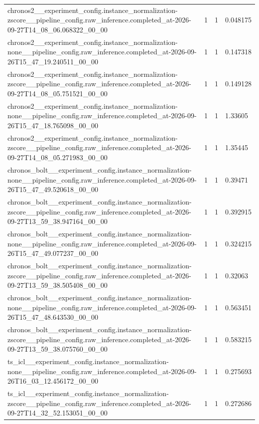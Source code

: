 \begin{tabular}{llll}
chronos2\_\_experiment\_config.instance\_normalization-zscore\_\_pipeline\_config.raw\_inference.completed\_at-2026-09-27T14\_08\_06.068322\_00\_00 & 1 & 1 & 0.048175 \\
chronos2\_\_experiment\_config.instance\_normalization-none\_\_pipeline\_config.raw\_inference.completed\_at-2026-09-26T15\_47\_19.240511\_00\_00 & 1 & 1 & 0.147318 \\
chronos2\_\_experiment\_config.instance\_normalization-zscore\_\_pipeline\_config.raw\_inference.completed\_at-2026-09-27T14\_08\_05.751521\_00\_00 & 1 & 1 & 0.149128 \\
chronos2\_\_experiment\_config.instance\_normalization-none\_\_pipeline\_config.raw\_inference.completed\_at-2026-09-26T15\_47\_18.765098\_00\_00 & 1 & 1 & 1.33605 \\
chronos2\_\_experiment\_config.instance\_normalization-zscore\_\_pipeline\_config.raw\_inference.completed\_at-2026-09-27T14\_08\_05.271983\_00\_00 & 1 & 1 & 1.35445 \\
chronos\_bolt\_\_experiment\_config.instance\_normalization-none\_\_pipeline\_config.raw\_inference.completed\_at-2026-09-26T15\_47\_49.520618\_00\_00 & 1 & 1 & 0.39471 \\
chronos\_bolt\_\_experiment\_config.instance\_normalization-zscore\_\_pipeline\_config.raw\_inference.completed\_at-2026-09-27T13\_59\_38.947164\_00\_00 & 1 & 1 & 0.392915 \\
chronos\_bolt\_\_experiment\_config.instance\_normalization-none\_\_pipeline\_config.raw\_inference.completed\_at-2026-09-26T15\_47\_49.077237\_00\_00 & 1 & 1 & 0.324215 \\
chronos\_bolt\_\_experiment\_config.instance\_normalization-zscore\_\_pipeline\_config.raw\_inference.completed\_at-2026-09-27T13\_59\_38.505408\_00\_00 & 1 & 1 & 0.32063 \\
chronos\_bolt\_\_experiment\_config.instance\_normalization-none\_\_pipeline\_config.raw\_inference.completed\_at-2026-09-26T15\_47\_48.643530\_00\_00 & 1 & 1 & 0.563451 \\
chronos\_bolt\_\_experiment\_config.instance\_normalization-zscore\_\_pipeline\_config.raw\_inference.completed\_at-2026-09-27T13\_59\_38.075760\_00\_00 & 1 & 1 & 0.583215 \\
ts\_icl\_\_experiment\_config.instance\_normalization-none\_\_pipeline\_config.raw\_inference.completed\_at-2026-09-26T16\_03\_12.456172\_00\_00 & 1 & 1 & 0.275693 \\
ts\_icl\_\_experiment\_config.instance\_normalization-zscore\_\_pipeline\_config.raw\_inference.completed\_at-2026-09-27T14\_32\_52.153051\_00\_00 & 1 & 1 & 0.272686 \\

\end{tabular}

